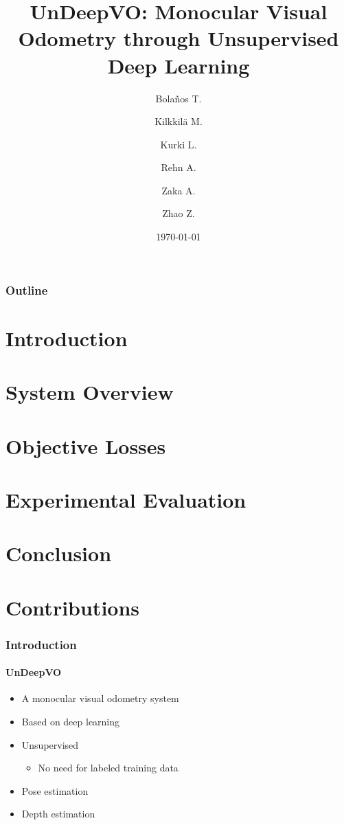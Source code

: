 \documentclass{beamer}
\title[UndeepVO]{UnDeepVO: Monocular Visual Odometry through Unsupervised Deep Learning}
\author{
    Bola\~nos T.\\
    \and
    Kilkkilä M.\\
    \and
    Kurki L.\\
    \and
    Rehn A.\\
    \and
    Zaka A.\\
    \and
    Zhao Z.
}
\date{\today}
\begin{document}
\begin{frame}
    \titlepage
\end{frame}

\begin{frame}
    \frametitle{Outline}
    \tableofcontents
\end{frame}

\section{Introduction}
\section{System Overview}
\section{Objective Losses}
\section{Experimental Evaluation}
\section{Conclusion}
\section{Contributions}

\begin{frame}
    \frametitle{Introduction}
    \framesubtitle{UnDeepVO}
    \begin{itemize}
        \item A monocular visual odometry system
        \item Based on deep learning
        \item Unsupervised
        \begin{itemize}
            \item No need for labeled training data
        \end{itemize}
        \item Pose estimation
        \item Depth estimation
    \end{itemize}
\end{frame}
\end{document}
